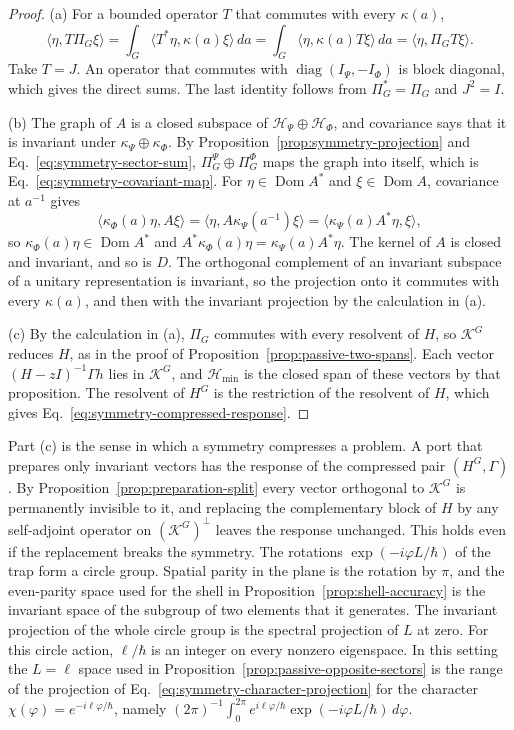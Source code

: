 \documentclass[11pt]{article}
\theoremstyle{definition}
\newcommand{\Hmin}{\mathcal H_{\min}}
\begin{document}
\begin{proof}
(a) For a bounded operator $T$ that commutes with every $\kappa(a)$,
\[
 \langle\eta,T\Pi_G\xi\rangle=\int_G\langle T^*\eta,\kappa(a)\xi\rangle\,da
   =\int_G\langle\eta,\kappa(a)T\xi\rangle\,da=\langle\eta,\Pi_GT\xi\rangle .
\]
Take $T=J$. An operator that commutes with $\operatorname{diag}(I_\Psi,-I_\Phi)$ is block diagonal, which gives the direct sums. The last identity follows from $\Pi_G^*=\Pi_G$ and $J^2=I$.

(b) The graph of $A$ is a closed subspace of $\mathcal H_\Psi\oplus\mathcal H_\Phi$, and covariance says that it is invariant under $\kappa_\Psi\oplus\kappa_\Phi$. By Proposition~\ref{prop:symmetry-projection} and Eq.~\eqref{eq:symmetry-sector-sum}, $\Pi_G^\Psi\oplus\Pi_G^\Phi$ maps the graph into itself, which is Eq.~\eqref{eq:symmetry-covariant-map}. For $\eta\in\operatorname{Dom}A^*$ and $\xi\in\operatorname{Dom}A$, covariance at $a^{-1}$ gives
\[
 \langle\kappa_\Phi(a)\eta,A\xi\rangle=\langle\eta,A\kappa_\Psi(a^{-1})\xi\rangle
   =\langle\kappa_\Psi(a)A^*\eta,\xi\rangle ,
\]
so $\kappa_\Phi(a)\eta\in\operatorname{Dom}A^*$ and $A^*\kappa_\Phi(a)\eta=\kappa_\Psi(a)A^*\eta$. The kernel of $A$ is closed and invariant, and so is $D$. The orthogonal complement of an invariant subspace of a unitary representation is invariant, so the projection onto it commutes with every $\kappa(a)$, and then with the invariant projection by the calculation in (a).

(c) By the calculation in (a), $\Pi_G$ commutes with every resolvent of $H$, so $\mathcal K^G$ reduces $H$, as in the proof of Proposition~\ref{prop:passive-two-spans}. Each vector $(H-zI)^{-1}\Gamma h$ lies in $\mathcal K^G$, and $\Hmin$ is the closed span of these vectors by that proposition. The resolvent of $H^G$ is the restriction of the resolvent of $H$, which gives Eq.~\eqref{eq:symmetry-compressed-response}.
\end{proof}

Part (c) is the sense in which a symmetry compresses a problem. A port that prepares only invariant vectors has the response of the compressed pair $(H^G,\Gamma)$. By Proposition~\ref{prop:preparation-split} every vector orthogonal to $\mathcal K^G$ is permanently invisible to it, and replacing the complementary block of $H$ by any self-adjoint operator on $(\mathcal K^G)^\perp$ leaves the response unchanged. This holds even if the replacement breaks the symmetry. The rotations $\exp(-i\varphi L/\hbar)$ of the trap form a circle group. Spatial parity in the plane is the rotation by $\pi$, and the even-parity space used for the shell in Proposition~\ref{prop:shell-accuracy} is the invariant space of the subgroup of two elements that it generates. The invariant projection of the whole circle group is the spectral projection of $L$ at zero. For this circle action, $\ell/\hbar$ is an integer on every nonzero eigenspace. In this setting the $L=\ell$ space used in Proposition~\ref{prop:passive-opposite-sectors} is the range of the projection of Eq.~\eqref{eq:symmetry-character-projection} for the character $\chi(\varphi)=e^{-i\ell\varphi/\hbar}$, namely $(2\pi)^{-1}\int_0^{2\pi}e^{i\ell\varphi/\hbar}\exp(-i\varphi L/\hbar)\,d\varphi$.
\end{document}

